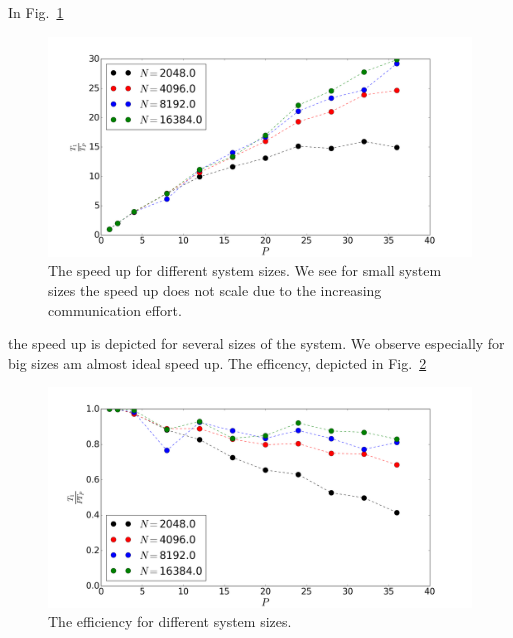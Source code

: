 In Fig.~\ref{fig:speedup}\begin{figure}[h] 
  \centering
     \includegraphics[width=\textwidth]{pic/speedup.png}
  \caption{The speed up for different system sizes. We see for small system sizes the speed up does not scale due to the increasing communication effort.}
  \label{fig:speedup}
\end{figure} the speed up is depicted for several sizes of the system. We observe especially for big sizes am almost ideal speed up. The efficency, depicted in Fig.~\ref{fig:efficency}\begin{figure}[h] 
  \centering
     \includegraphics[width=\textwidth]{pic/efficency.png}
  \caption{The efficiency for different system sizes.}
  \label{fig:efficency}

\end{figure}
